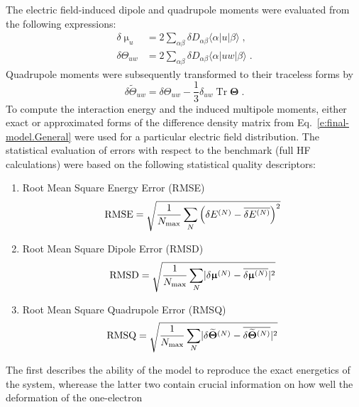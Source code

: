 \documentclass[aip,graphicx]{revtex4-1}
\newcommand{\tbraket}[3]{\ensuremath{\bigl\langle {#1} \bigl\lvert {#2} \bigl\lvert {#3} \bigr\rangle}}
\newcommand{\BM}[1]{\bm{#1}}
\DeclareMathOperator{\Tr}{Tr}
\begin{document}
The electric field\hyp{}induced dipole and quadrupole moments were evaluated from the following expressions:
%
\begin{subequations}\label{e:dmult}
  \begin{align}
   \delta \upmu_{u}   &= 2\sum_{\alpha\beta} \delta D_{\alpha\beta} \tbraket{\alpha}{u}{\beta}  \;,\\
   \delta \Theta_{uw} &= 2\sum_{\alpha\beta} \delta D_{\alpha\beta} \tbraket{\alpha}{uw}{\beta} \;. 
  \end{align}
\end{subequations}
%
Quadrupole moments were subsequently transformed to their traceless forms by
%
\begin{equation}
  \delta \widetilde{\Theta}_{uw} = \delta \Theta_{uw} - \frac{1}{3} \delta_{uw} \Tr{\BM\Theta} \;.
\end{equation}
%
To compute the interaction energy and the induced multipole moments, either exact or approximated forms
of the difference density matrix from Eq.~\eqref{e:final-model.General}
were used for a particular electric field distribution. The statistical evaluation of
errors with respect to the benchmark (full HF calculations) were based on 
the following statistical quality descriptors:
%
\begin{enumerate}
 \item Root Mean Square Energy Error (RMSE)
   \begin{equation}\label{e:rmse}
     {\rm RMSE} = \sqrt{ \frac{1}{N_{\rm max}} \sum_N \left( \delta E^{(N)} - \overline{\delta E^{(N)}}\right)^2 }
   \end{equation}
 \item Root Mean Square Dipole Error (RMSD)
   \begin{equation}\label{e:rmsd}
     {\rm RMSD} = \sqrt{ \frac{1}{N_{\rm max}}\sum_N \lvert \delta {\BM\upmu}^{(N)} - \overline{\delta {\BM\upmu}^{(N)}}\rvert^2 }
   \end{equation}
 \item Root Mean Square Quadrupole Error (RMSQ)
   \begin{equation}\label{e:rmsq}
     {\rm RMSQ} = \sqrt{ \frac{1}{N_{\rm max}}\sum_N \lvert \delta \widetilde{\BM\Theta}^{(N)} - \overline{\delta \widetilde{\BM\Theta}^{(N)}}\rvert^2 }
   \end{equation}
\end{enumerate}
%
The first describes the ability of the model to reproduce the exact energetics of the system, 
wherease the latter two contain crucial information on how well the deformation of the one\hyp{}electron
\end{document}
